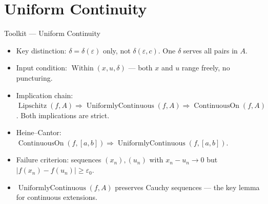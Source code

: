 
\section{Uniform Continuity}

\begin{toolkitbox}{Toolkit --- Uniform Continuity}
\begin{itemize}
  \item Key distinction: $\delta=\delta(\varepsilon)$ only, not
    $\delta(\varepsilon,c)$. One $\delta$ serves all pairs in $A$.
  \item Input condition: $\operatorname{Within}(x,u,\delta)$ --- both
    $x$ and $u$ range freely, no puncturing.
  \item Implication chain: $\operatorname{Lipschitz}(f,A)
    \Rightarrow\operatorname{UniformlyContinuous}(f,A)
    \Rightarrow\operatorname{ContinuousOn}(f,A)$.
    Both implications are strict.
  \item Heine--Cantor: $\operatorname{ContinuousOn}(f,[a,b])
    \Rightarrow\operatorname{UniformlyContinuous}(f,[a,b])$.
  \item Failure criterion: sequences $(x_n),(u_n)$ with
    $x_n-u_n\to 0$ but $|f(x_n)-f(u_n)|\geq\varepsilon_0$.
  \item $\operatorname{UniformlyContinuous}(f,A)$ preserves Cauchy
    sequences --- the key lemma for continuous extensions.
\end{itemize}
\end{toolkitbox}



